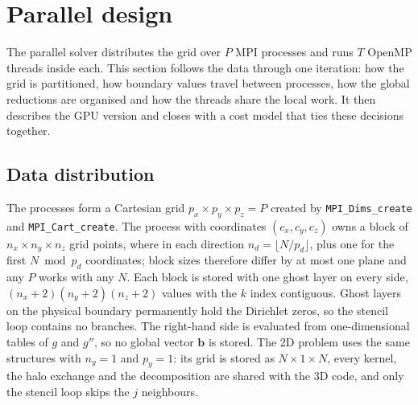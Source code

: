 \documentclass[10pt,a4paper]{article}
\newcommand{\code}[1]{\texttt{#1}}
\newcommand{\vb}[1]{\mathbf{#1}}
\begin{document}
\section{Parallel design}\label{sec:design}

The parallel solver distributes the grid over $P$ MPI processes and runs $T$ OpenMP threads inside each.
This section follows the data through one iteration: how the grid is partitioned, how boundary values
travel between processes, how the global reductions are organised and how the threads share the local
work. It then describes the GPU version and closes with a cost model that ties these decisions together.

\subsection{Data distribution}\label{sec:decomp}
The processes form a Cartesian grid $p_x\times p_y\times p_z=P$ created by \code{MPI\_Dims\_create} and
\code{MPI\_Cart\_create}. The process with coordinates $(c_x,c_y,c_z)$ owns a block of $n_x\times n_y\times
n_z$ grid points, where in each direction $n_d=\lfloor N/p_d\rfloor$, plus one for the first $N\bmod p_d$
coordinates; block sizes therefore differ by at most one plane and any $P$ works with any $N$. Each block is
stored with one ghost layer on every side, $(n_x+2)(n_y+2)(n_z+2)$ values with the $k$ index contiguous.
Ghost layers on the physical boundary permanently hold the Dirichlet zeros, so the stencil loop contains
no branches. The right-hand side is evaluated from one-dimensional tables of $g$ and $g''$, so no global
vector $\vb b$ is stored. The 2D problem uses the same structures with $n_y=1$ and $p_y=1$: its grid is
stored as $N\times1\times N$, every kernel, the halo exchange and the decomposition are shared with the 3D
code, and only the stencil loop skips the $j$ neighbours.
\end{document}
